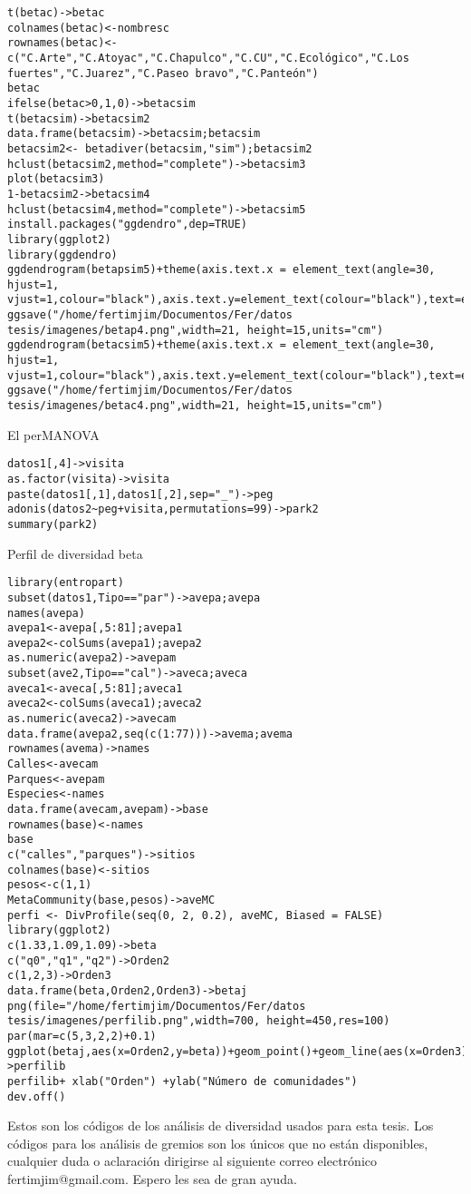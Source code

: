 \documentclass[letterpaper,12pt]{article}
\begin{document}
\begin{lstlisting}
t(betac)->betac
colnames(betac)<-nombresc
rownames(betac)<-c("C.Arte","C.Atoyac","C.Chapulco","C.CU","C.Ecológico","C.Los fuertes","C.Juarez","C.Paseo bravo","C.Panteón")
betac
ifelse(betac>0,1,0)->betacsim
t(betacsim)->betacsim2
data.frame(betacsim)->betacsim;betacsim
betacsim2<- betadiver(betacsim,"sim");betacsim2
hclust(betacsim2,method="complete")->betacsim3
plot(betacsim3)
1-betacsim2->betacsim4
hclust(betacsim4,method="complete")->betacsim5
install.packages("ggdendro",dep=TRUE)
library(ggplot2)
library(ggdendro)
ggdendrogram(betapsim5)+theme(axis.text.x = element_text(angle=30, hjust=1, vjust=1,colour="black"),axis.text.y=element_text(colour="black"),text=element_text(family="serif"))
ggsave("/home/fertimjim/Documentos/Fer/datos tesis/imagenes/betap4.png",width=21, height=15,units="cm")
ggdendrogram(betacsim5)+theme(axis.text.x = element_text(angle=30, hjust=1, vjust=1,colour="black"),axis.text.y=element_text(colour="black"),text=element_text(family="serif"))
ggsave("/home/fertimjim/Documentos/Fer/datos tesis/imagenes/betac4.png",width=21, height=15,units="cm")
\end{lstlisting}
El perMANOVA
\begin{lstlisting}
datos1[,4]->visita
as.factor(visita)->visita
paste(datos1[,1],datos1[,2],sep="_")->peg
adonis(datos2~peg+visita,permutations=99)->park2
summary(park2)
\end{lstlisting}
Perfil de diversidad beta
\begin{lstlisting}
library(entropart)
subset(datos1,Tipo=="par")->avepa;avepa
names(avepa)
avepa1<-avepa[,5:81];avepa1
avepa2<-colSums(avepa1);avepa2
as.numeric(avepa2)->avepam
subset(ave2,Tipo=="cal")->aveca;aveca
aveca1<-aveca[,5:81];aveca1
aveca2<-colSums(aveca1);aveca2
as.numeric(aveca2)->avecam
data.frame(avepa2,seq(c(1:77)))->avema;avema
rownames(avema)->names
Calles<-avecam
Parques<-avepam
Especies<-names
data.frame(avecam,avepam)->base
rownames(base)<-names
base
c("calles","parques")->sitios
colnames(base)<-sitios
pesos<-c(1,1)
MetaCommunity(base,pesos)->aveMC
perfi <- DivProfile(seq(0, 2, 0.2), aveMC, Biased = FALSE)
library(ggplot2)
c(1.33,1.09,1.09)->beta
c("q0","q1","q2")->Orden2
c(1,2,3)->Orden3
data.frame(beta,Orden2,Orden3)->betaj
png(file="/home/fertimjim/Documentos/Fer/datos tesis/imagenes/perfilib.png",width=700, height=450,res=100)
par(mar=c(5,3,2,2)+0.1)
ggplot(betaj,aes(x=Orden2,y=beta))+geom_point()+geom_line(aes(x=Orden3))+theme(panel.background=element_blank(),axis.text.x=element_text(colour="black"),text=element_text(family="serif"),axis.text.y=element_text(colour="black"))->perfilib
perfilib+ xlab("Orden") +ylab("Número de comunidades")
dev.off()
\end{lstlisting}
Estos son los códigos de los análisis de diversidad usados para esta tesis. Los códigos para los análisis de gremios son los únicos que no están disponibles, cualquier duda o aclaración dirigirse al siguiente correo electrónico fertimjim@gmail.com. Espero les sea de gran ayuda.
\end{document}
